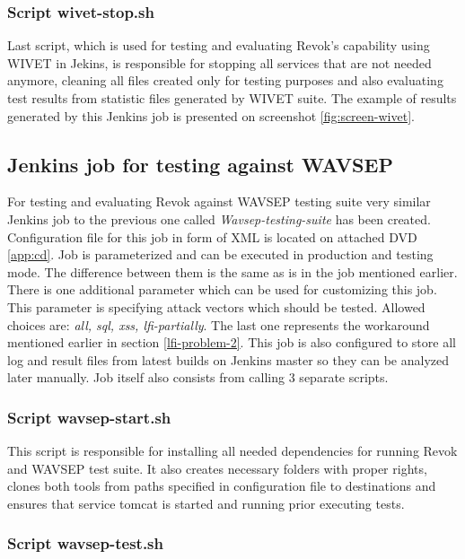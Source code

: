 			\subsubsection{Script wivet-stop.sh}
			
			Last script, which is used for testing and evaluating Revok's capability using WIVET in Jekins, is responsible for stopping all services that are not needed anymore, cleaning all files created only for testing purposes and also evaluating test results from statistic files generated by WIVET suite. The example of results generated by this Jenkins job is presented on screenshot \ref{fig:screen-wivet}.
		
		\subsection{Jenkins job for testing against WAVSEP}
		
For testing and evaluating Revok against WAVSEP testing suite very similar Jenkins job to the previous one called \textit{Wavsep-testing-suite} has been created. Configuration file for this job in form of XML is located on attached DVD \ref{app:cd}. Job is parameterized and can be executed in production and testing mode. The difference between them is the same as is in the job mentioned earlier. There is one additional parameter which can be used for customizing this job. This parameter is specifying attack vectors which should be tested. Allowed choices are: \textit{all, sql, xss, lfi-partially}. The last one represents the workaround mentioned earlier in section \ref{lfi-problem-2}. This job is also configured to store all log and result files from latest builds on Jenkins master so they can be analyzed later manually. Job itself also consists from calling 3 separate scripts.
	
			\subsubsection{Script wavsep-start.sh}
			
			This script is responsible for installing all needed dependencies for running Revok and WAVSEP test suite. It also creates necessary folders with proper rights, clones both tools from paths specified in configuration file to destinations and ensures that service tomcat \cite{TOMCAT} is started and running prior executing tests.			
			
			\subsubsection{Script wavsep-test.sh}
			
